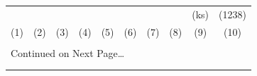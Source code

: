 \begin{landscape}
\begin{center}
\begin{longtable}{l l l l l l l l l l}
  \multicolumn{1}{c}{} & 
  \multicolumn{1}{c}{} &
  \multicolumn{1}{c}{} &
  \multicolumn{1}{c}{} &
  \multicolumn{1}{c}{} &
  \multicolumn{1}{c}{} &
  \multicolumn{1}{c}{} &
  \multicolumn{1}{c}{} &
  \multicolumn{1}{c}{(ks)} &
  \multicolumn{1}{c}{(1238)} \\
  
  \multicolumn{1}{c}{(1)} & 
  \multicolumn{1}{c}{(2)} &
  \multicolumn{1}{c}{(3)} &
  \multicolumn{1}{c}{(4)} &
  \multicolumn{1}{c}{(5)} &
  \multicolumn{1}{c}{(6)} &
  \multicolumn{1}{c}{(7)} &
  \multicolumn{1}{c}{(8)} &
  \multicolumn{1}{c}{(9)} &
  \multicolumn{1}{c}{(10)} \\[0.5ex] \hline \\[-1.8ex]
  \endhead

\multicolumn{10}{l}{{Continued on Next Page\ldots}} \\
\endfoot

\\[-1.8ex] \hline \hline
\endlastfoot


\end{longtable}
\end{center}
\end{landscape}
